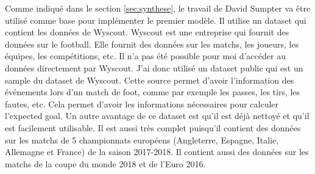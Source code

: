 \documentclass[12pt]{article}
\begin{document}
\noindent Comme indiqué dans le section \ref{sec:synthese}, le travail de David Sumpter \cite{sumpterFittingXGModel} va être utilisé comme base pour implémenter le premier modèle. Il utilise un dataset qui contient les données de Wyscout. Wyscout est une entreprise qui fournit des données sur le football. Elle fournit des données sur les matchs, les joueurs, les équipes, les compétitions, etc. Il n'a pas été possible pour moi d'accéder au données directement par Wyscout. J'ai donc utilisé un dataset public qui est un sample du dataset de Wyscout. \cite{pappalardoPublicDataSet2019}
\newline
\noindent Cette source permet d'avoir l'information des événements lors d'un match de foot, comme par exemple les passes, les tirs, les fautes, etc. Cela permet d'avoir les informations nécessaires pour calculer l'expected goal. Un autre avantage de ce dataset est qu'il est déjà nettoyé et qu'il est facilement utilisable. Il est aussi très complet puisqu'il contient des données sur les matchs de 5 championnats européens (Angleterre, Espagne, Italie, Allemagne et France) de la saison 2017-2018. Il contient aussi des données sur les matchs de la coupe du monde 2018 et de l'Euro 2016.





\end{document}
